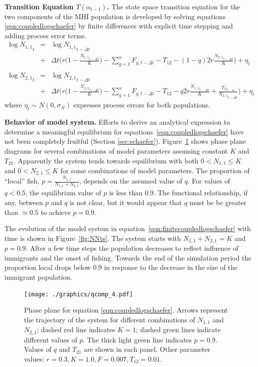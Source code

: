 \documentclass[12pt,letterpaper,twoside]{article}
\newcommand\None{{N_{1,1}}}
\newcommand\Ntwo{{N_{2,1}}}
\newcommand\Nsum{{N_{1,1}+N_{2,1}}}
\begin{document}
{\bf Transition Equation $T(\alpha_{t-1})$.}
The state space transition equation for the two components of the MHI
population is developed by solving
equations \ref{eqn:coupledlogschaefer} by finite differences
with explicit time stepping and adding process error
terms.
\begin{eqnarray}
\label{eqn:finitecoupledlogschaefer}
\log \None_t &=& \log \None_{t-\Delta t}\nonumber\\ 
             &+&\Delta t\bigg(r\Big(1-\frac{\None_{t-\Delta t}}{K}\Big)
-\sum_{g=1}^n F_{g,t-\Delta t} - T_{12} - (1-q)2r\frac{\Ntwo_{t-\Delta
t}}{K}\bigg)+\eta_t\nonumber\\
\\ \log \Ntwo_t &=& \log \Ntwo_{t-\Delta t}\nonumber\\
             &+&\Delta t\bigg(r\Big(1-\frac{\Ntwo_{t-\Delta t}}{K}\Big)
-\sum_{g=1}^n F_{g,t-\Delta t} - T_{12} - q2r\frac{\None_{t-\Delta t}}{K}
     +\frac{T_{{21}_{t-\Delta t}}}{\Ntwo_{t-\Delta t}}\bigg)+\eta_t\nonumber
\end{eqnarray}
where $\eta_t \sim N(0,\sigma_N)$
expresses process errors for both populations.

{\bf Behavior of model system.}
Efforts to derive an analytical expression to determine 
a meaningful equilibrium for equations~\ref{eqn:coupledlogschaefer}
have not been completely fruitful (Section \ref{sec:schaefer}).
Figure~\ref{fig:NNphase} shows phase plane diagrams for several
combinations of model parameters assuming constant $K$ and
$T_{21}$. Apparently the system tends towards
equilibrium with both $0 < \None \le K$ and $0 < \Ntwo \le K$ for some
combinations of model parameters.
The proportion of ``local'' fish, $p = \frac{\None}{\Nsum}$, depends on
the assumed value of $q$. For values of $q < 0.5$, the equilibrium
value of $p$ is less than 0.9. The functional relationship, if any,
between $p$ and $q$ is not clear, but it would appear that $q$ must be
be greater than $\simeq 0.5$ to achieve $p=0.9$.

The evolution of the model system in
equation~\ref{eqn:finitecoupledlogschaefer} with time is shown in
Figure~\ref{fig:NNts}. The system starts with $\None + \Ntwo = K$ and
$p=0.9$. After a few time steps the population decreases to reflect
influence of immigrants and the onset of fishing.
Towards the end of the simulation period the proportion local drops
below 0.9 in response to the decrease in the size of the immigrant
population.

\begin{figure}
\begin{center}
\texttt{[image: ./graphics/qcomp\_4.pdf]}
\caption{\label{fig:NNphase}
Phase plane for equation \ref{eqn:coupledlogschaefer}. Arrows represent
the trajectory of the system for different combinations of $\None$ and
$\Ntwo$; dashed red  line indicates $K = 1$; dashed green lines indicate
different values of $p$. The thick light green line indicates $p=0.9$.
Values of $q$ and $T_{21}$ are shown in each panel.
Other parameter values: $r=0.3, K=1.0, F = 0.007, T_{12}=0.01$.
}
\end{center}
\end{figure}
\end{document}
